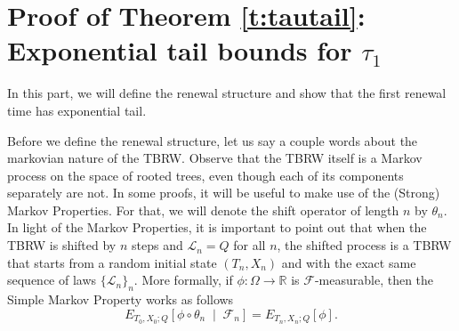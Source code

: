 \documentclass[a4paper]{amsart}
\newtheorem{lemma}{Lemma}
\newcommand{\Law}{\mathcal{L}}
\begin{document}


\section{Proof of Theorem \ref{t:tautail}: Exponential tail bounds for $\tau_1$ }\label{s:prooftautail}
 In this part, we will define the renewal structure and show that the first renewal time has exponential tail. 

Before we define the renewal structure, let us say a couple words about the markovian nature of the TBRW. Observe that the TBRW itself is a Markov process on the space of rooted trees, even though each of its components separately are not. In some proofs, it will be useful to make use of the (Strong) Markov Properties. For that, we will denote the shift operator of length $n$ by $\theta_n$. In light of the Markov Properties, it is important to point out that when the TBRW is shifted by $n$ steps and $\Law_n = Q$ for all $n$, the shifted process is a TBRW that starts from a random initial state $(T_n,X_n)$ and with the exact same sequence of laws $\{\Law_n\}_n$. More formally, if $\phi: \Omega \to \mathbb{R}$ is $\mathcal{F}$-measurable, then the Simple Markov Property works as follows
$$
E_{T_0,X_0;Q}\left [\phi\circ \theta_n \; \middle | \; \mathcal{F}_n\right] = E_{T_n,X_n;Q}\left [\phi\right].
$$
\end{document}
